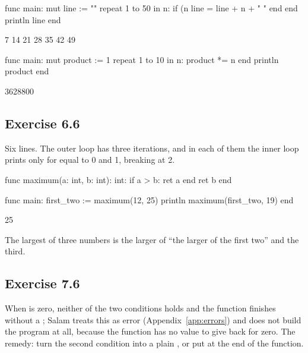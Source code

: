 
\begin{salamcode}
func main:
    mut line := ""
    repeat 1 to 50 in n:
        if (n %
            line = line + n + " "
        end
    end
    println line
end
\end{salamcode}
\begin{salamout}
7 14 21 28 35 42 49
\end{salamout}

\begin{salamcode}
func main:
    mut product := 1
    repeat 1 to 10 in n:
        product *= n
    end
    println product
end
\end{salamcode}
\begin{salamout}
3628800
\end{salamout}

\subsection*{Exercise 6.6}
Six lines. The outer loop has three iterations, and in each of them the
inner loop prints only for  equal to 0 and 1, breaking at 2.


\begin{salamcode}
func maximum(a: int, b: int): int:
    if a > b: ret a end
    ret b
end

func main:
    first_two := maximum(12, 25)
    println maximum(first_two, 19)
end
\end{salamcode}
\begin{salamout}
25
\end{salamout}

The largest of three numbers is the larger of ``the larger of the first
two'' and the third.

\subsection*{Exercise 7.6}
When  is zero, neither of the two conditions holds and the function
finishes without a ; Salam treats this as error  (Appendix~\ref{app:errors}) and does not build the program at all, because the
function has no value to give back for zero. The remedy: turn the second condition into a
plain , or put  at the end of the function.

